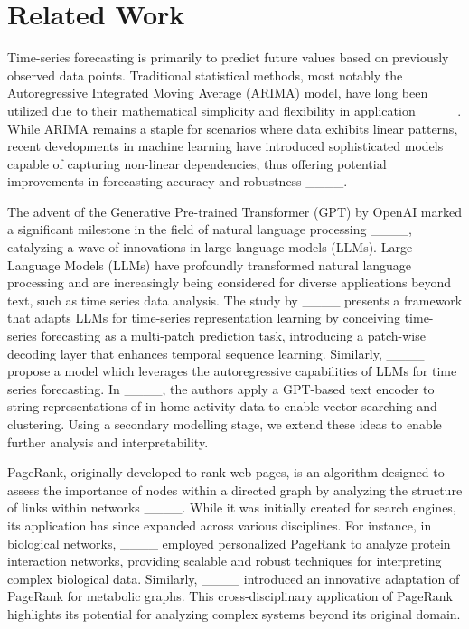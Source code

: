 \section{Related Work}
Time-series forecasting is primarily to predict future values based on previously observed data points. Traditional statistical methods, most notably the Autoregressive Integrated Moving Average (ARIMA) model, have long been utilized due to their mathematical simplicity and flexibility in application ____. While ARIMA remains a staple for scenarios where data exhibits linear patterns, recent developments in machine learning have introduced sophisticated models capable of capturing non-linear dependencies, thus offering potential improvements in forecasting accuracy and robustness ____.

The advent of the Generative Pre-trained Transformer (GPT) by OpenAI marked a significant milestone in the field of natural language processing ____, catalyzing a wave of innovations in large language models (LLMs). Large Language Models (LLMs) have profoundly transformed natural language processing and are increasingly being considered for diverse applications beyond text, such as time series data analysis. The study by ____ presents a framework that adapts LLMs for time-series representation learning by conceiving time-series forecasting as a multi-patch prediction task, introducing a patch-wise decoding layer that enhances temporal sequence learning. Similarly, ____ propose a model which leverages the autoregressive capabilities of LLMs for time series forecasting. In ____, the authors apply a GPT-based text encoder to string representations of in-home activity data to enable vector searching and clustering. Using a secondary modelling stage, we extend these ideas to enable further analysis and interpretability.

PageRank, originally developed to rank web pages, is an algorithm designed to assess the importance of nodes within a directed graph by analyzing the structure of links within networks ____. While it was initially created for search engines, its application has since expanded across various disciplines. For instance, in biological networks, ____ employed personalized PageRank to analyze protein interaction networks, providing scalable and robust techniques for interpreting complex biological data. Similarly, ____ introduced an innovative adaptation of PageRank for metabolic graphs. This cross-disciplinary application of PageRank highlights its potential for analyzing complex systems beyond its original domain.